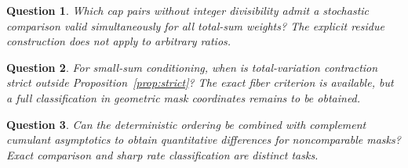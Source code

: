 \documentclass[11pt,a4paper]{article}
\newtheorem{question}{Question}
\theoremstyle{remark}\newtheorem*{ednote}{Editorial note (ProveIt, 2026-10-01)}
\begin{document}
\begin{question}
Which cap pairs without integer divisibility admit a stochastic comparison valid simultaneously for all total-sum weights? The explicit residue construction does not apply to arbitrary ratios.
\end{question}
\begin{question}
For small-sum conditioning, when is total-variation contraction strict outside Proposition~\ref{prop:strict}? The exact fiber criterion is available, but a full classification in geometric mask coordinates remains to be obtained.
\end{question}
\begin{question}
Can the deterministic ordering be combined with complement cumulant asymptotics to obtain quantitative differences for noncomparable masks? Exact comparison and sharp rate classification are distinct tasks.
\end{question}
\end{document}
